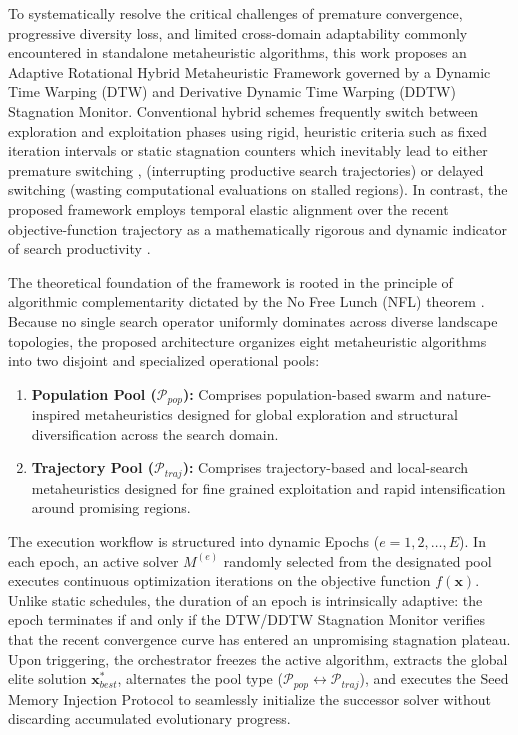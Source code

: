 To systematically resolve the critical challenges of premature convergence, progressive diversity loss, and limited cross-domain adaptability commonly encountered in standalone metaheuristic algorithms, this work proposes an Adaptive Rotational Hybrid Metaheuristic Framework governed by a Dynamic Time Warping (DTW) and Derivative Dynamic Time Warping (DDTW) Stagnation Monitor. Conventional hybrid schemes frequently switch between exploration and exploitation phases using rigid, heuristic criteria such as fixed iteration intervals or static stagnation counters which inevitably lead to either premature switching \cite{talbi2016combining}, (interrupting productive search trajectories) or delayed switching (wasting computational evaluations on stalled regions)\cite{akbulut2026artificial}. In contrast, the proposed framework employs temporal elastic alignment over the recent objective-function trajectory as a mathematically rigorous and dynamic indicator of search productivity  \cite{karimimamaghan2022machine}.

The theoretical foundation of the framework is rooted in the principle of algorithmic complementarity dictated by the No Free Lunch (NFL) theorem \cite{wolpert1997no}. Because no single search operator uniformly dominates across diverse landscape topologies, the proposed architecture organizes eight metaheuristic algorithms into two disjoint and specialized operational pools:
\begin{enumerate}
    \item \textbf{Population Pool ($\mathcal{P}_{pop}$):} Comprises population-based swarm and nature-inspired metaheuristics designed for global exploration and structural diversification across the search domain.
    \item \textbf{Trajectory Pool ($\mathcal{P}_{traj}$):} Comprises trajectory-based and local-search metaheuristics designed for fine grained exploitation and rapid intensification around promising regions.
\end{enumerate}

The execution workflow is structured into dynamic Epochs ($e = 1, 2, \dots, E$). In each epoch, an active solver $M^{(e)}$ randomly selected from the designated pool executes continuous optimization iterations on the objective function $f(\mathbf{x})$. Unlike static schedules, the duration of an epoch is intrinsically adaptive: the epoch terminates if and only if the DTW/DDTW Stagnation Monitor verifies that the recent convergence curve has entered an unpromising stagnation plateau. Upon triggering, the orchestrator freezes the active algorithm, extracts the global elite solution $\mathbf{x}_{best}^*$, alternates the pool type ($\mathcal{P}_{pop} \leftrightarrow \mathcal{P}_{traj}$), and executes the Seed Memory Injection Protocol to seamlessly initialize the successor solver without discarding accumulated evolutionary progress.



